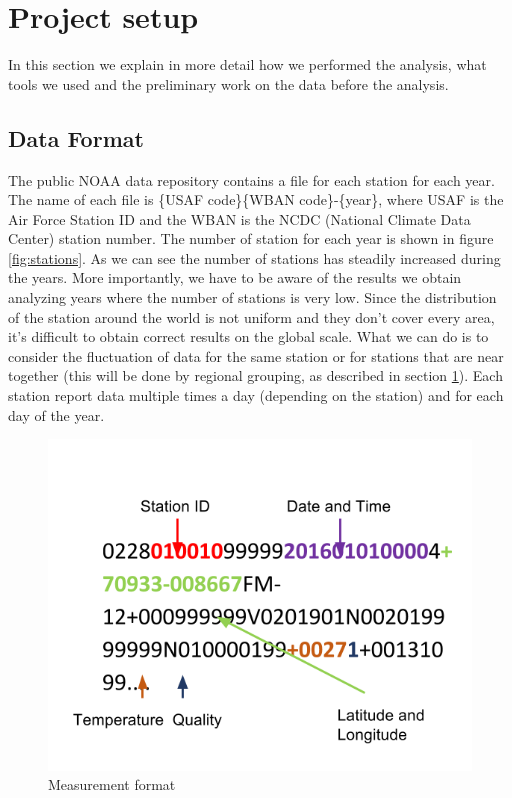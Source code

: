 \documentclass{vldb}
\begin{document}
\section{Project setup}
\label{sec:pro}
In this section we explain in more detail how we performed the analysis, what tools we used and the preliminary work on the data before the analysis. 

\subsection{Data Format}
The public NOAA data repository contains a file for each station for each year. The name of each file is \{USAF code\}\-\{WBAN code\}-\{year\}, where USAF is the Air Force Station ID and the WBAN is the NCDC (National Climate Data Center) station number. The number of station for each year is shown in figure \ref{fig:stations}. As we can see the number of stations has steadily increased during the years. More importantly, we have to be aware of the results we obtain analyzing years where the number of stations is very low. Since the distribution of the station around the world is not uniform and they don't cover every area, it's difficult to obtain correct results on the global scale. What we can do is to consider the fluctuation of data for the same station or for stations that are near together (this will be done by regional grouping, as described in section \ref{sec:pro}). Each station report data multiple times a day (depending on the station) and for each day of the year. \\

\begin{figure}[tbh]
\includegraphics[width=1\linewidth]{data}
\caption{Measurement format}
\label{fig:data}
\end{figure}
\end{document}
